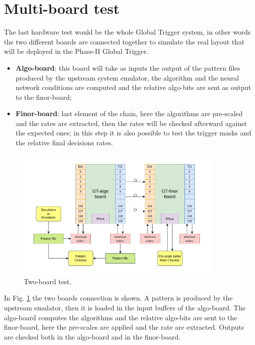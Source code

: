 \documentclass[../../main.tex]{subfiles}
\begin{document}
\vfill
        
\section{Multi-board test}
\label{sec:Finor_multiboard}
The last hardware test would be the whole Global Trigger system, in other words the two different boards are connected together to simulate the real layout that will be deployed in the Phase-II Global Trigger.
\begin{itemize}
    \item \textbf{Algo-board}: this board will take as inputs the output of the pattern files produced by the upstream system emulator, the algorithm and the neural network conditions are computed and the relative algo-bits are sent as output to the finor-board;
    \item \textbf{Finor-board}: last element of the chain, here the algorithms are pre-scaled and the rates are extracted, then the rates will be checked afterward against the expected ones; in this step it is also possible to test the trigger masks and the relative final decisions rates.
\end{itemize}

\begin{figure}[h]
    \centering
    \includegraphics[width=0.9\textwidth]{sections/06/Images/Board_test.pdf}
    \caption{Two-board test.}
    \label{fig:Two_board_test}
\end{figure}

In Fig. \ref{fig:Two_board_test} the two boards connection is shown. A pattern is produced by the upstream emulator, then it is loaded in the input buffers of the algo-board. The algo-board computes the algorithms and the relative algo-bits are sent to the finor-board, here the pre-scales are applied and the rate are extracted. Outputs are checked both in the algo-board and in the finor-board.
\end{document}
